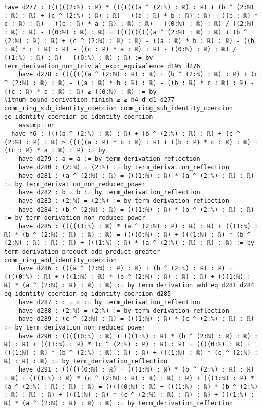 \documentclass{article}
\begin{document}
\begin{tcolorbox}[colback=white!10, width=\linewidth]
\begin{lstlisting}[language=Lean4]
    have d277 : ((((((2:ℕ) : ℝ) * (((((((a ^ (2:ℕ) : ℝ) : ℝ) + (b ^ (2:ℕ) : ℝ) : ℝ) + (c ^ (2:ℕ) : ℝ) : ℝ) - ((a : ℝ) * b : ℝ) : ℝ) - ((b : ℝ) * c : ℝ) : ℝ) - ((c : ℝ) * a : ℝ) : ℝ) : ℝ) - ((0:ℕ) : ℝ) : ℝ) / ((2:ℕ) : ℝ) : ℝ) - ((0:ℕ) : ℝ) : ℝ) = ((((((((((a ^ (2:ℕ) : ℝ) : ℝ) + (b ^ (2:ℕ) : ℝ) : ℝ) + (c ^ (2:ℕ) : ℝ) : ℝ) - ((a : ℝ) * b : ℝ) : ℝ) - ((b : ℝ) * c : ℝ) : ℝ) - ((c : ℝ) * a : ℝ) : ℝ) - ((0:ℕ) : ℝ) : ℝ) / ((1:ℕ) : ℝ) : ℝ) - ((0:ℕ) : ℝ) : ℝ) := by term_derivation_non_trivial_expr_equivalence d195 d276
    have d278 : (((((((a ^ (2:ℕ) : ℝ) : ℝ) + (b ^ (2:ℕ) : ℝ) : ℝ) + (c ^ (2:ℕ) : ℝ) : ℝ) - ((a : ℝ) * b : ℝ) : ℝ) - ((b : ℝ) * c : ℝ) : ℝ) - ((c : ℝ) * a : ℝ) : ℝ) ≥ ((0:ℕ) : ℝ) := by litnum_bound_derivation_finish ≥ ≥ h4 d d1 d277 comm_ring_sub_identity_coercion comm_ring_sub_identity_coercion ge_identity_coercion ge_identity_coercion
    assumption
  have h6 : ((((a ^ (2:ℕ) : ℝ) : ℝ) + (b ^ (2:ℕ) : ℝ) : ℝ) + (c ^ (2:ℕ) : ℝ) : ℝ) ≥ (((((a : ℝ) * b : ℝ) : ℝ) + ((b : ℝ) * c : ℝ) : ℝ) + ((c : ℝ) * a : ℝ) : ℝ) := by
    have d279 : a = a := by term_derivation_reflection
    have d280 : (2:ℕ) = (2:ℕ) := by term_derivation_reflection
    have d281 : (a ^ (2:ℕ) : ℝ) = (((1:ℕ) : ℝ) * (a ^ (2:ℕ) : ℝ) : ℝ) := by term_derivation_non_reduced_power
    have d282 : b = b := by term_derivation_reflection
    have d283 : (2:ℕ) = (2:ℕ) := by term_derivation_reflection
    have d284 : (b ^ (2:ℕ) : ℝ) = (((1:ℕ) : ℝ) * (b ^ (2:ℕ) : ℝ) : ℝ) := by term_derivation_non_reduced_power
    have d285 : (((((1:ℕ) : ℝ) * (a ^ (2:ℕ) : ℝ) : ℝ) : ℝ) + (((1:ℕ) : ℝ) * (b ^ (2:ℕ) : ℝ) : ℝ) : ℝ) = ((((0:ℕ) : ℝ) + (((1:ℕ) : ℝ) * (b ^ (2:ℕ) : ℝ) : ℝ) : ℝ) + (((1:ℕ) : ℝ) * (a ^ (2:ℕ) : ℝ) : ℝ) : ℝ) := by term_derivation_product_add_product_greater comm_ring_add_identity_coercion
    have d286 : (((a ^ (2:ℕ) : ℝ) : ℝ) + (b ^ (2:ℕ) : ℝ) : ℝ) = ((((0:ℕ) : ℝ) + (((1:ℕ) : ℝ) * (b ^ (2:ℕ) : ℝ) : ℝ) : ℝ) + (((1:ℕ) : ℝ) * (a ^ (2:ℕ) : ℝ) : ℝ) : ℝ) := by term_derivation_add_eq d281 d284 eq_identity_coercion eq_identity_coercion d285
    have d287 : c = c := by term_derivation_reflection
    have d288 : (2:ℕ) = (2:ℕ) := by term_derivation_reflection
    have d289 : (c ^ (2:ℕ) : ℝ) = (((1:ℕ) : ℝ) * (c ^ (2:ℕ) : ℝ) : ℝ) := by term_derivation_non_reduced_power
    have d290 : (((((0:ℕ) : ℝ) + (((1:ℕ) : ℝ) * (b ^ (2:ℕ) : ℝ) : ℝ) : ℝ) : ℝ) + (((1:ℕ) : ℝ) * (c ^ (2:ℕ) : ℝ) : ℝ) : ℝ) = ((((0:ℕ) : ℝ) + (((1:ℕ) : ℝ) * (b ^ (2:ℕ) : ℝ) : ℝ) : ℝ) + (((1:ℕ) : ℝ) * (c ^ (2:ℕ) : ℝ) : ℝ) : ℝ) := by term_derivation_reflection
    have d291 : ((((((0:ℕ) : ℝ) + (((1:ℕ) : ℝ) * (b ^ (2:ℕ) : ℝ) : ℝ) : ℝ) + (((1:ℕ) : ℝ) * (c ^ (2:ℕ) : ℝ) : ℝ) : ℝ) : ℝ) + (((1:ℕ) : ℝ) * (a ^ (2:ℕ) : ℝ) : ℝ) : ℝ) = (((((0:ℕ) : ℝ) + (((1:ℕ) : ℝ) * (b ^ (2:ℕ) : ℝ) : ℝ) : ℝ) + (((1:ℕ) : ℝ) * (c ^ (2:ℕ) : ℝ) : ℝ) : ℝ) + (((1:ℕ) : ℝ) * (a ^ (2:ℕ) : ℝ) : ℝ) : ℝ) := by term_derivation_reflection

\end{lstlisting}
\end{tcolorbox}
\end{document}
